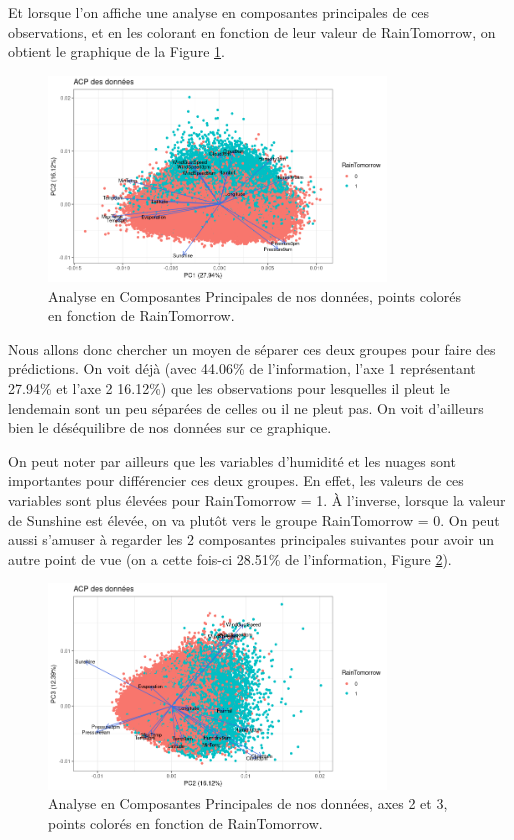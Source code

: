 \documentclass{article}
\begin{document}
Et lorsque l'on affiche une analyse en composantes principales de ces observations, et en les colorant en fonction de leur valeur de RainTomorrow, on obtient le graphique de la Figure \ref{fig:pca_raintomorrow}.

\begin{figure}[htp]
    \centering
    \includegraphics[width=0.8\textwidth]{Images/pca/pca.png}
    \caption{Analyse en Composantes Principales de nos données, points colorés en fonction de RainTomorrow.}
    \label{fig:pca_raintomorrow}
\end{figure}

Nous allons donc chercher un moyen de séparer ces deux groupes pour faire des prédictions. On voit déjà (avec 44.06\% de l'information, l'axe 1 représentant 27.94\% et l'axe 2 16.12\%) que les observations pour lesquelles il pleut le lendemain sont un peu séparées de celles ou il ne pleut pas. On voit d'ailleurs bien le déséquilibre de nos données sur ce graphique.

On peut noter par ailleurs que les variables d'humidité et les nuages sont importantes pour différencier ces deux groupes. En effet, les valeurs de ces variables sont plus élevées pour RainTomorrow = 1. À l'inverse, lorsque la valeur de Sunshine est élevée, on va plutôt vers le groupe RainTomorrow = 0. On peut aussi s'amuser à regarder les 2 composantes principales suivantes pour avoir un autre point de vue (on a cette fois-ci 28.51\% de l'information, Figure \ref{fig:pca_raintomorrow2}).

\begin{figure}[htp]
    \centering
    \includegraphics[width=0.8\textwidth]{Images/pca/pca2.png}
    \caption{Analyse en Composantes Principales de nos données, axes 2 et 3, points colorés en fonction de RainTomorrow.}
    \label{fig:pca_raintomorrow2}
\end{figure}
\end{document}
